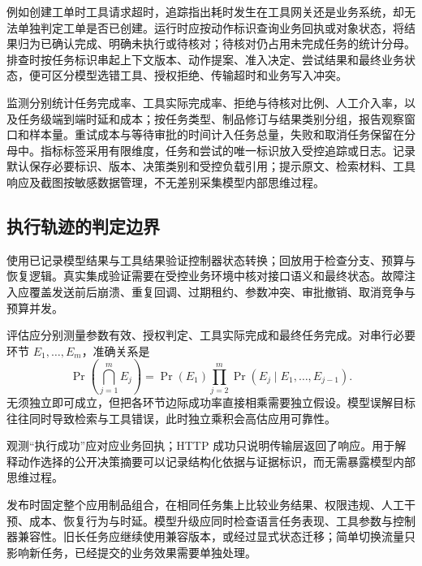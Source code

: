 \documentclass[../textbook.tex]{subfiles}
\begin{document}
例如创建工单时工具请求超时，追踪指出耗时发生在工具网关还是业务系统，却无法单独判定工单是否已创建。运行时应按动作标识查询业务回执或对象状态，将结果归为已确认完成、明确未执行或待核对；待核对仍占用未完成任务的统计分母。排查时按任务标识串起上下文版本、动作提案、准入决定、尝试结果和最终业务状态，便可区分模型选错工具、授权拒绝、传输超时和业务写入冲突。

监测分别统计任务完成率、工具实际完成率、拒绝与待核对比例、人工介入率，以及任务级端到端时延和成本；按任务类型、制品修订与结果类别分组，报告观察窗口和样本量。重试成本与等待审批的时间计入任务总量，失败和取消任务保留在分母中。指标标签采用有限维度，任务和尝试的唯一标识放入受控追踪或日志。记录默认保存必要标识、版本、决策类别和受控负载引用；提示原文、检索材料、工具响应及截图按敏感数据管理，不无差别采集模型内部思维过程。

\subsection{执行轨迹的判定边界}
使用已记录模型结果与工具结果验证控制器状态转换；回放用于检查分支、预算与恢复逻辑。真实集成验证需要在受控业务环境中核对接口语义和最终状态。故障注入应覆盖发送前后崩溃、重复回调、过期租约、参数冲突、审批撤销、取消竞争与预算并发。

评估应分别测量参数有效、授权判定、工具实际完成和最终任务完成。对串行必要环节 $E_1,\ldots,E_m$，准确关系是
\begin{equation}
 \Pr\left(\bigcap_{j=1}^mE_j\right)
 =\Pr(E_1)\prod_{j=2}^m\Pr(E_j\mid E_1,\ldots,E_{j-1}).
\end{equation}
无须独立即可成立，但把各环节边际成功率直接相乘需要独立假设。模型误解目标往往同时导致检索与工具错误，此时独立乘积会高估应用可靠性。

观测“执行成功”应对应业务回执；HTTP 成功只说明传输层返回了响应。用于解释动作选择的公开决策摘要可以记录结构化依据与证据标识，而无需暴露模型内部思维过程。

发布时固定整个应用制品组合，在相同任务集上比较业务结果、权限违规、人工干预、成本、恢复行为与时延。模型升级应同时检查语言任务表现、工具参数与控制器兼容性。旧长任务应继续使用兼容版本，或经过显式状态迁移；简单切换流量只影响新任务，已经提交的业务效果需要单独处理。




\chapterreferences
\myendchapterdocument
\end{document}
